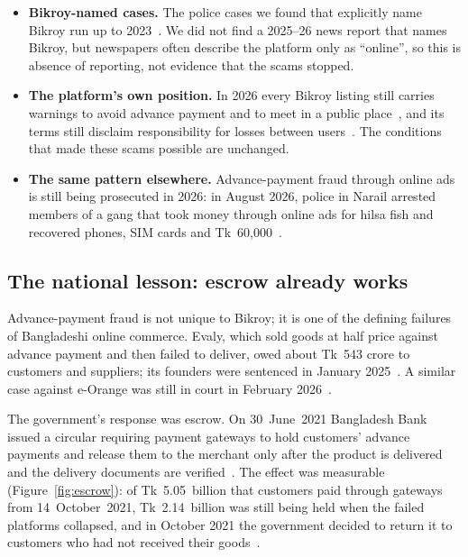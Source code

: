 \begin{itemize}
  \item \textbf{Bikroy-named cases.} The police cases we found that explicitly name Bikroy
  run up to 2023~\cite{pa_2023,ds_muktagacha}. We did not find a 2025--26 news report that
  names Bikroy, but newspapers often describe the platform only as ``online'', so this is
  absence of reporting, not evidence that the scams stopped.
  \item \textbf{The platform's own position.} In 2026 every Bikroy listing still carries
  warnings to avoid advance payment and to meet in a public place~\cite{bikroy_listing}, and
  its terms still disclaim responsibility for losses between users~\cite{bikroy_terms}. The
  conditions that made these scams possible are unchanged.
  \item \textbf{The same pattern elsewhere.} Advance-payment fraud through online ads is
  still being prosecuted in 2026: in August 2026, police in Narail arrested members of a
  gang that took money through online ads for hilsa fish and recovered phones, SIM cards and
  Tk~60{,}000~\cite{itv_hilsa}.
\end{itemize}

\subsection{The national lesson: escrow already works}
\label{sec:escrowlesson}

Advance-payment fraud is not unique to Bikroy; it is one of the defining failures of
Bangladeshi online commerce. Evaly, which sold goods at half price against advance payment and then
failed to deliver, owed about Tk~543 crore to customers and suppliers; its founders were
sentenced in January 2025~\cite{bdnews_evaly}. A similar case against e-Orange was still
in court in February 2026~\cite{bdnews_eorange}.

The government's response was escrow. On 30~June~2021 Bangladesh Bank issued a circular
requiring payment gateways to hold customers' advance payments and release them to the
merchant only after the product is delivered and the delivery documents are
verified~\cite{tbs_escrow}. The effect was measurable (Figure~\ref{fig:escrow}): of
Tk~5.05~billion that customers paid through gateways from 14~October~2021, Tk~2.14~billion
was still being held when the failed platforms collapsed, and in October 2021 the government
decided to return it to customers who had not received their goods~\cite{fe_refund}.

